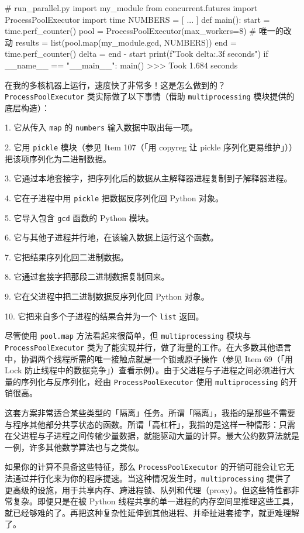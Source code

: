 \begin{codebox}[python]
# run_parallel.py
import my_module
from concurrent.futures import ProcessPoolExecutor
import time
NUMBERS = [
    ...
]
def main():
    start = time.perf_counter()
    pool = ProcessPoolExecutor(max_workers=8)  # 唯一的改动
    results = list(pool.map(my_module.gcd, NUMBERS))
    end = time.perf_counter()
    delta = end - start
    print(f"Took {delta:.3f} seconds")
if __name__ == "__main__":
    main()
>>>
Took 1.684 seconds
\end{codebox}

在我的多核机器上运行，速度快了非常多！这是怎么做到的？\texttt{ProcessPoolExecutor} 类实际做了以下事情（借助 \texttt{multiprocessing} 模块提供的底层构造）：

1. 它从传入 \texttt{map} 的 \texttt{numbers} 输入数据中取出每一项。

2. 它用 \texttt{pickle} 模块（参见 Item 107（「用 copyreg 让 pickle 序列化更易维护」））把该项序列化为二进制数据。

3. 它通过本地套接字，把序列化后的数据从主解释器进程复制到子解释器进程。

4. 它在子进程中用 \texttt{pickle} 把数据反序列化回 Python 对象。

5. 它导入包含 \texttt{gcd} 函数的 Python 模块。

6. 它与其他子进程并行地，在该输入数据上运行这个函数。

7. 它把结果序列化回二进制数据。

8. 它通过套接字把那段二进制数据复制回来。

9. 它在父进程中把二进制数据反序列化回 Python 对象。

10. 它把来自多个子进程的结果合并为一个 \texttt{list} 返回。

尽管使用 \texttt{pool.map} 方法看起来很简单，但 \texttt{multiprocessing} 模块与 \texttt{ProcessPoolExecutor} 类为了能实现并行，做了海量的工作。在大多数其他语言中，协调两个线程所需的唯一接触点就是一个锁或原子操作（参见 Item 69（「用 Lock 防止线程中的数据竞争」）查看示例）。由于父进程与子进程之间必须进行大量的序列化与反序列化，经由 \texttt{ProcessPoolExecutor} 使用 \texttt{multiprocessing} 的开销很高。

这套方案非常适合某些类型的「隔离」任务。所谓「隔离」，我指的是那些不需要与程序其他部分共享状态的函数。所谓「高杠杆」，我指的是这样一种情形：只需在父进程与子进程之间传输少量数据，就能驱动大量的计算。最大公约数算法就是一例，许多其他数学算法也与之类似。

如果你的计算不具备这些特征，那么 \texttt{ProcessPoolExecutor} 的开销可能会让它无法通过并行化来为你的程序提速。当这种情况发生时，\texttt{multiprocessing} 提供了更高级的设施，用于共享内存、跨进程锁、队列和代理（proxy）。但这些特性都非常复杂。即便只是在被 Python 线程共享的单一进程的内存空间里推理这些工具，就已经够难的了。再把这种复杂性延伸到其他进程、并牵扯进套接字，就更难理解了。

